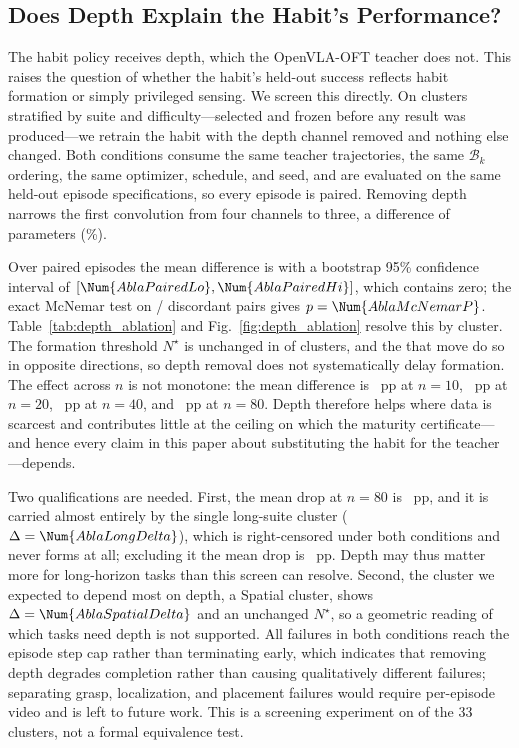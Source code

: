 \subsection{Does Depth Explain the Habit's Performance?}
\label{sec:depth_ablation}

The habit policy receives depth, which the OpenVLA-OFT teacher does not. This raises
the question of whether the habit's held-out success reflects habit formation or
simply privileged sensing. We screen this directly. On  clusters
stratified by suite and difficulty---selected and frozen before any result was
produced---we retrain the habit with the depth channel removed and nothing else
changed. Both conditions consume the same teacher trajectories, the same
$\mathcal{B}_k$ ordering, the same optimizer, schedule, and seed, and are evaluated on
the same  held-out episode specifications, so every episode is paired.
Removing depth narrows the first convolution from four channels to three, a difference
of  parameters (\%).

Over  paired episodes the mean difference is 
with a bootstrap 95\% confidence interval of $[\Num{AblaPairedLo},
\Num{AblaPairedHi}]$, which contains zero; the exact McNemar test on
/ discordant pairs gives $p = \Num{AblaMcNemarP}$.
Table~\ref{tab:depth_ablation} and Fig.~\ref{fig:depth_ablation} resolve this by
cluster. The formation threshold $N^{\star}$ is unchanged in  of
 clusters, and the  that move do so in opposite
directions, so depth removal does not systematically delay formation. The effect
across $n$ is not monotone: the mean difference is ~pp at $n=10$,
~pp at $n=20$, ~pp at $n=40$, and
~pp at $n=80$. Depth therefore helps where data is scarcest and
contributes little at the ceiling on which the maturity certificate---and hence every
claim in this paper about substituting the habit for the teacher---depends.

Two qualifications are needed. First, the mean drop at $n=80$ is
~pp, and it is carried almost entirely by the single
long-suite cluster ($\Delta = \Num{AblaLongDelta}$), which is right-censored under
both conditions and never forms at all; excluding it the mean drop is
~pp. Depth may thus matter more for long-horizon tasks than
this screen can resolve. Second, the cluster we expected to depend most on depth,
a Spatial cluster, shows $\Delta = \Num{AblaSpatialDelta}$ and an unchanged
$N^{\star}$, so a geometric reading of which tasks need depth is not supported. All
failures in both conditions reach the episode step cap rather than terminating early,
which indicates that removing depth degrades completion rather than causing
qualitatively different failures; separating grasp, localization, and placement
failures would require per-episode video and is left to future work. This is a
screening experiment on  of the 33 clusters, not a formal
equivalence test.
